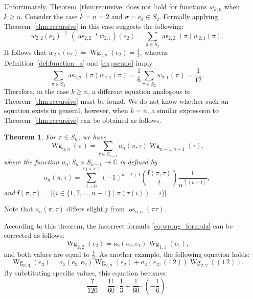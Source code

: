 \documentclass[pdftex]{sigma}
\numberwithin{equation}{section}
\newtheorem{Theorem}{Theorem}[section]
\theoremstyle{definition}
\newcommand{\fix}[1]{\mathsf{f}(#1)}
\DeclareMathOperator{\Raise}{as}
\DeclareMathOperator{\Wg}{Wg}
\begin{document}
Unfortunately, Theorem~\ref{thm:recursive} does not hold for functions $w_{k,n}$ when $k \ge n$.
Consider the case $k=n=2$ and $\sigma =e_2 \in S_2$.
Formally applying Theorem~\ref{thm:recursive} in this case suggests the following:
\begin{equation} \label{eq:wrong_formula}
w_{2,2}(e_2) \stackrel{?}{=} (\Raise_{2,2} * w_{2,1})(e_2) = \sum_{\pi \in S_2} \Raise_{2,2}(\pi) w_{2,1}(\pi).
\end{equation}
It follows that $w_{2,2}(e_2)=\Wg_{2,2}(e_2)= \frac{1}{3}$,
whereas
Definition~\ref{def:function_a} and \eqref{eq:pseudo} imply
\[
\sum_{\pi \in S_2} \Raise_{2,2}(\pi) w_{2,1}(\pi)= \frac{1}{6}
\sum_{\pi \in S_2} w_{2,1}(\pi)= \frac{1}{12}.
\]
Therefore, in the case $k \ge n$, a different equation analogous to Theorem~\ref{thm:recursive} must be found.
We do not know whether such an equation exists in general; however, when $k=n$,
a similar expression to Theorem~\ref{thm:recursive} can be obtained as follows.

\begin{Theorem} \label{thm:dim_equal_degree}
For $\pi \in S_n$, we have
\[
\Wg_{n,n}(\pi)= \sum_{\tau \in S_{n-1}}
a_n(\pi, \tau) \Wg_{n-1,n-1}(\tau),
\]
where the function $a_n\colon S_n \times S_{n-1} \to \mathbb{C}$ is defined by
\begin{equation} \label{eq:def_new_a}
a_n(\pi, \tau)= \sum_{t=0}^{\fix{\pi, \tau}} (-1)^{n-t+1}
\binom{\fix{\pi, \tau}}{t} \frac{1}{n^{\uparrow (n-t)}},
\end{equation}
and $\fix{\pi,\tau}= |\{i \in \{1,2,\dots, n-1\} \mid
\pi (\tau(i))=i \}|$.
\end{Theorem}

Note that $a_n(\pi, \tau)$ differs slightly from $\Raise_{n,n}(\pi \tau)$.

According to this theorem, the incorrect formula \eqref{eq:wrong_formula} can be corrected as follows:
\[
\Wg_{2,2}(e_2)=a_2(e_2,e_1) \Wg_{1,1}(e_1),
\]
and both values are equal to $\frac{1}{3}$.
As another example, the following equation holds:
\[
\Wg_{3,3}(e_3)= a_3(e_3, e_2) \Wg_{2,2}(e_2)+
a_3(e_3, (1 \, 2)) \Wg_{2,2}
((1 \, 2)).
\]
By substituting specific values, this equation becomes:
\[
\frac{7}{120}= \frac{11}{60} \cdot \frac{1}{3} + \frac{1}{60} \cdot \left(- \frac{1}{6}\right).
\]
\end{document}
